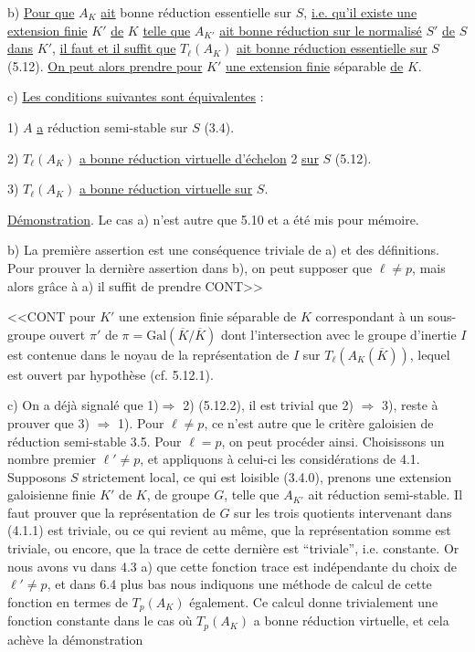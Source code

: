 b) \underline{Pour que} $A_K$ \underline{ait} bonne réduction essentielle sur $S$, \underline{i.e. qu'il existe une extension finie} $K'$ \underline{de} $K$ \underline{telle que} $A_{K'}$ \underline{ait bonne réduction sur le normalisé} $S'$ \underline{de} $S$ \underline{dans} $K'$, \underline{il faut et il suffit que} $T_\ell(A_K)$ \underline{ait bonne réduction essentielle sur} $S$ (5.12). \underline{On peut alors prendre pour} $K'$ \underline{une extension finie} séparable \underline{de} $K$.

c) \underline{Les conditions suivantes sont équivalentes} :

1) $A$ \underline{a} réduction semi-stable sur $S$ (3.4).

2) $T_\ell(A_K)$ \underline{a bonne réduction virtuelle d'échelon} 2 \underline{sur} $S$ (5.12).

3) $T_\ell(A_K)$ \underline{a bonne réduction virtuelle sur} $S$.

\underline{Démonstration}. Le cas a) n'est autre que 5.10 et a été mis pour mémoire.

b) La première assertion est une conséquence triviale de a) et des définitions. Pour prouver la dernière assertion dans b), on peut supposer que $\ell \neq p$, mais alors grâce à a) il suffit de prendre CONT>>



<<CONT pour $K'$ une extension finie séparable de $K$ correspondant à un sous-groupe ouvert $\pi'$ de $\pi = \mathrm{Gal}(\overline{K}/\overline{K})$ dont l'intersection avec le groupe d'inertie $I$ est contenue dans le noyau de la représentation de $I$ sur $T_\ell(A_K(\overline{K}))$, lequel est ouvert par hypothèse (cf. 5.12.1).

c) On a déjà signalé que 1)$\Longrightarrow$ 2) (5.12.2), il est trivial que 2) $\Longrightarrow$ 3), reste à prouver que 3) $\Longrightarrow$ 1). Pour $\ell \neq p$, ce n'est autre que le critère galoisien de réduction semi-stable 3.5. Pour $\ell = p$, on peut procéder ainsi. Choisissons un nombre premier $\ell' \neq p$, et appliquons à celui-ci les considérations de 4.1. Supposons $S$ strictement local, ce qui est loisible (3.4.0), prenons une extension galoisienne finie $K'$ de $K$, de groupe $G$, telle que $A_{K'}$ ait réduction semi-stable. Il faut prouver que la représentation de $G$ sur les trois quotients intervenant dans (4.1.1) est triviale, ou ce qui revient au même, que la représentation somme est triviale, ou encore, que la trace de cette dernière est ``triviale'', i.e. constante. Or nous avons vu dans 4.3 a) que cette fonction trace est indépendante du choix de $\ell' \neq p$, et dans 6.4 plus bas nous indiquons une méthode de calcul de cette fonction en termes de $T_p(A_K)$ également. Ce calcul donne trivialement une fonction constante dans le cas où $T_p(A_K)$ a bonne réduction virtuelle, et cela achève la démonstration

